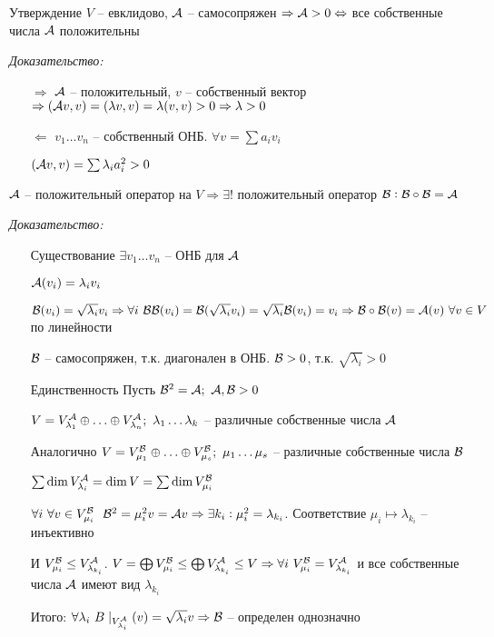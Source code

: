 \documentclass[12pt]{article}
\begin{document}
\begin{theo}{Утверждение}
    $V$ -- евклидово, $\mathcal{A}$ -- самосопряжен $\Rightarrow \\ \mathcal{A} > 0 \Leftrightarrow$ все собственные числа $\mathcal{A}$ положительны
\end{theo}

\textit{Доказательство:}

\begin{itemize}
    \item[$\Rightarrow$] $\mathcal{A}$ -- положительный, $v$ -- собственный вектор $\Rightarrow (\mathcal{A} v, v) = (\lambda v, v) = \lambda (v, v) > 0 \Rightarrow \lambda > 0$
    
    \item[$\Leftarrow$] $v_1 \ldots v_n$ -- собственный ОНБ. $\forall v = \sum a_iv_i$
    
    $(\mathcal{A} v, v) = \sum \lambda_ia_i^2 > 0$
\end{itemize}

\begin{theo}{}
    $\mathcal{A}$ -- положительный оператор на $V \Rightarrow \exists!$ положительный оператор $\mathcal{B} : \mathcal{B} \circ \mathcal{B} = \mathcal{A}$
\end{theo}

\textit{Доказательство:}

\begin{itemize}
    \item[Существование] $\exists v_1 \ldots v_n$ -- ОНБ для $\mathcal{A}$
    
    $\mathcal{A}(v_i) = \lambda_i v_i$

    $\mathcal{B}(v_i) = \sqrt{\lambda_i}v_i \Rightarrow \forall i\ \mathcal{B}\mathcal{B}(v_i) = \mathcal{B}(\sqrt{\lambda_i}v_i) = \sqrt{\lambda_i}\mathcal{B}(v_i) = v_i \Rightarrow \mathcal{B} \circ \mathcal{B}(v) = \mathcal{A}(v)\ \forall v \in V$ по линейности

    $\mathcal{B}$ -- самосопряжен, т.к. диагонален в ОНБ. $\mathcal{B} > 0$, т.к. $\sqrt{\lambda_i} > 0$

    \item[Единственность] Пусть $\mathcal{B}^2 = \mathcal{A};\ \mathcal{A}, \mathcal{B} > 0$
    
    $V = V_{\lambda_1}^{\mathcal{A}} \oplus \ldots \oplus V_{\lambda_n}^{\mathcal{A}};\ \lambda_1 \ldots \lambda_k$ -- различные собственные числа $\mathcal{A}$

    Аналогично $V = V_{\mu_1}^{\mathcal{B}} \oplus \ldots \oplus V_{\mu_s}^{\mathcal{B}};\ \mu_1 \ldots \mu_s$ -- различные собственные числа $\mathcal{B}$

    $\sum \dim V_{\lambda_i}^{\mathcal{A}} = \dim V = \sum \dim V_{\mu_i}^{\mathcal{B}}$

    $\forall i\ \forall v \in V_{\mu_i}^\B\ \ \B^2 = \mu_i^2 v = \A v \Rightarrow \exists k_i : \mu_i^2 = \lambda_{k_i}$. Соответствие $\mu_i \mapsto \lambda_{k_i}$ -- инъективно 

    И $V_{\mu_i}^{\mathcal{B}} \leq V_{\lambda_{k_i}}^{\mathcal{A}}$. $V = \bigoplus V_{\mu_i}^{\mathcal{B}} \leq \bigoplus V_{\lambda_{k_i}}^{\mathcal{A}} \leq V \Rightarrow \forall i\ V_{\mu_i}^{\mathcal{B}} = V_{\lambda_{k_i}}^{\mathcal{A}}$ и все собственные числа $\mathcal{A}$ имеют вид $\lambda_{k_i}$

    Итого: $\forall \lambda_i\ B\mid_{V_{\lambda_i}^\A}(v) = \sqrt{\lambda_i}v \Rightarrow \B$ -- определен однозначно
\end{itemize}
\end{document}

